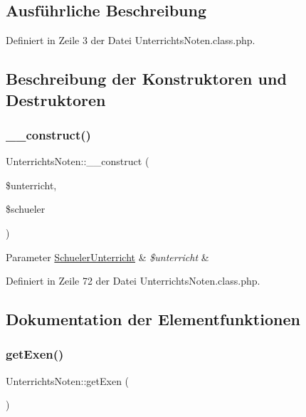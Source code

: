 \subsection{Ausführliche Beschreibung}


Definiert in Zeile 3 der Datei Unterrichts\+Noten.\+class.\+php.



\subsection{Beschreibung der Konstruktoren und Destruktoren}
\mbox{\label{class_unterrichts_noten_ae76f0d5c378eed886a6e9c82f308f75f}} 
\subsubsection{\texorpdfstring{\+\_\+\+\_\+construct()}{\_\_construct()}}
{\footnotesize\ttfamily Unterrichts\+Noten\+::\+\_\+\+\_\+construct (\begin{DoxyParamCaption}\item[{}]{\$unterricht,  }\item[{}]{\$schueler }\end{DoxyParamCaption})}


\begin{DoxyParams}[1]{Parameter}
\mbox{\hyperlink{class_schueler_unterricht}{Schueler\+Unterricht}} & {\em \$unterricht} & \\
\hline
\end{DoxyParams}


Definiert in Zeile 72 der Datei Unterrichts\+Noten.\+class.\+php.



\subsection{Dokumentation der Elementfunktionen}
\mbox{\label{class_unterrichts_noten_a5e1d25f56dedb89f485365e1c63ce5c3}} 
\subsubsection{\texorpdfstring{get\+Exen()}{getExen()}}
{\footnotesize\ttfamily Unterrichts\+Noten\+::get\+Exen (\begin{DoxyParamCaption}{ }\end{DoxyParamCaption})}

